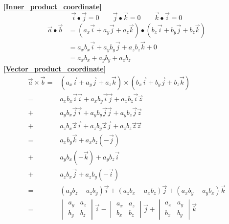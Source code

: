	\begin{minipage}{.6\textwidth}
		\textbf{\large \ref{Inner_product_coordinate}}
		$$\overrightarrow{i}\bullet\overrightarrow{j}=0\qquad\overrightarrow{j}\bullet\overrightarrow{k}=0\qquad\overrightarrow{k}\bullet\overrightarrow{i}=0$$
		\begin{align*}
			\overrightarrow{a}\bullet\overrightarrow{b}&=(a_x\overrightarrow{i}+a_y\overrightarrow{j}+a_z\overrightarrow{k})\bullet(b_x\overrightarrow{i}+b_y\overrightarrow{j}+b_z\overrightarrow{k})\\
			&=a_xb_x\overrightarrow{i}+a_yb_y\overrightarrow{j}+a_zb_z\overrightarrow{k}+0\\
			&=a_xb_x+a_yb_y+a_zb_z
		\end{align*}
	\textbf{\large \ref{Vector_product_coordinate}}
	\begin{align*}
		\overrightarrow{a}\times\overrightarrow{b}=&(a_x\overrightarrow{i}+a_y\overrightarrow{j}+a_z\overrightarrow{k})\times(b_x\overrightarrow{i}+b_y\overrightarrow{j}+b_z\overrightarrow{k})\\
		=&a_xb_x\overrightarrow{i}\overrightarrow{i}+a_xb_y\overrightarrow{i}\overrightarrow{j}+a_xb_z\overrightarrow{i}\overrightarrow{z}\\
		+&a_yb_x\overrightarrow{j}\overrightarrow{i}+a_yb_y\overrightarrow{j}\overrightarrow{j}+a_yb_z\overrightarrow{j}\overrightarrow{z}\\
		+&a_zb_x\overrightarrow{z}\overrightarrow{i}+a_zb_y\overrightarrow{z}\overrightarrow{j}+a_zb_z\overrightarrow{z}\overrightarrow{z}\\
		=&a_xb_y\overrightarrow{k}+a_xb_z(-\overrightarrow{j})\\
		+&a_yb_x(-\overrightarrow{k})+a_yb_z\overrightarrow{i}\\
		+&a_zb_x\overrightarrow{j}+a_zb_y(-\overrightarrow{i})\\
		=&(a_yb_z-a_zb_y)\overrightarrow{i}+(a_zb_x-a_xb_z)\overrightarrow{j}+(a_xb_y-a_yb_x)\overrightarrow{k}\\
		=&\begin{vmatrix}
			a_y & a_z\\
			b_y & b_z
		\end{vmatrix}\overrightarrow{i}-\begin{vmatrix}
			a_x & a_z\\
			b_x & b_z
		\end{vmatrix}\overrightarrow{j}+\begin{vmatrix}
			a_x & a_y\\
			b_x & b_y
		\end{vmatrix}\overrightarrow{k}
	\end{align*}
\end{minipage}
